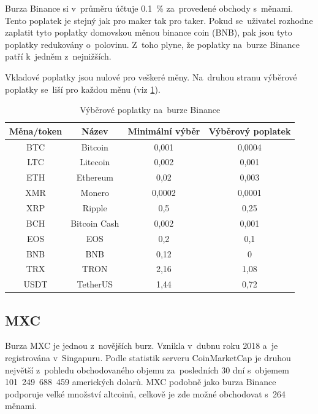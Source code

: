 \documentclass[thesis=B,czech]{FITthesis}[2019/03/21]
\begin{document}
Burza Binance si v~průměru účtuje 0.1~\% za~provedené obchody s~měnami. Tento poplatek je stejný jak pro maker tak pro taker. Pokud se~uživatel rozhodne zaplatit tyto poplatky domovskou měnou binance coin (BNB), pak jsou tyto poplatky redukovány o~polovinu. Z~toho plyne, že poplatky na~burze Binance patří k~jedněm z~nejnižších.

Vkladové poplatky jsou nulové pro veškeré měny. Na~druhou stranu \linebreak výběrové poplatky se~liší pro každou měnu (viz \ref{binance_fees}). \cite{blockonomi_binance}

\begin{table}\centering
    \caption{Výběrové poplatky na~burze Binance \cite{binance_fees}}
    \label{binance_fees}
     \begin{tabular}{||c | c | c | c||} 
     \hline
     Měna/token & Název & Minimální výběr & Výběrový poplatek \\ [0.5ex] 
     \hline\hline
     BTC & Bitcoin & 0,001 & 0,0004 \\ 
     \hline
     LTC & Litecoin & 0,002 & 0,001 \\
     \hline
     ETH & Ethereum & 0,02 & 0,003 \\
     \hline
     XMR & Monero & 0,0002 & 0,0001 \\
     \hline
     XRP & Ripple & 0,5 & 0,25 \\
     \hline
     BCH & Bitcoin Cash & 0,002 & 0,001 \\
     \hline
     EOS & EOS & 0,2 & 0,1 \\
     \hline
     BNB & BNB & 0,12 & 0 \\
     \hline
     TRX & TRON & 2,16 & 1,08 \\
     \hline
     USDT & TetherUS & 1,44 & 0,72 \\
     \hline
    \end{tabular}
\end{table}
\subsection{MXC}
Burza MXC je jednou z~novějších burz. Vznikla v~dubnu roku 2018 a~je registrována v~Singapuru. Podle statistik serveru CoinMarketCap je druhou největší z~pohledu obchodovaného objemu za~posledních 30 dní s~objemem 101~249~688~459 amerických dolarů. \cite{coinmarketcap} MXC podobně jako burza Binance podporuje velké množství altcoinů, celkově je zde možné obchodovat s~264 měnami. \cite{mxc_coins}
\end{document}
